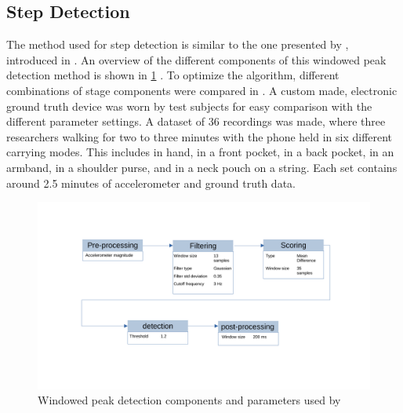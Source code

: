 \subsection*{Step Detection}
\label{sec:meth - step detection}
The method used for step detection is similar to the one presented by \cite{Salvi2018}, introduced in . 
 An overview of the different components of this windowed peak detection method is shown in \cref{fig:step_detection} . To optimize the algorithm, different combinations of stage components were compared in \cite{Salvi2018}. A custom made, electronic ground truth device was worn by test subjects for easy comparison with the different parameter settings. A dataset of 36 recordings was made,  where three researchers walking for two to three minutes with the phone held in six different carrying modes. This includes in hand, in a front pocket, in a back pocket, in an armband, in a shoulder purse, and in a neck pouch on a string. Each set contains around 2.5 minutes of accelerometer and ground truth data.
\begin{figure}
	\centering
	\includegraphics[trim=20 100 50 80, clip, width=0.7\linewidth]{images/step_detection}
	\caption{Windowed peak detection components and parameters used by \cite{Salvi2018}}
	\label{fig:step_detection}
\end{figure}

